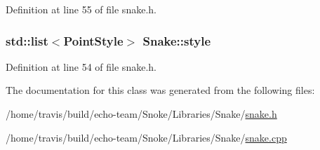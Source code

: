 Definition at line 55 of file snake.\-h.

\hypertarget{class_snake_a7db439ed2dd1cfea4c061e6ffd6ec54c}{
\subsubsection[{style}]{\setlength{\rightskip}{0pt plus 5cm}std\-::list$<${\bf Point\-Style}$>$ Snake\-::style\hspace{0.3cm}{\ttfamily [private]}}}\label{class_snake_a7db439ed2dd1cfea4c061e6ffd6ec54c}


Definition at line 54 of file snake.\-h.



The documentation for this class was generated from the following files\-:\begin{DoxyCompactItemize}
\item 
/home/travis/build/echo-\/team/\-Snoke/\-Libraries/\-Snake/\hyperlink{snake_8h}{snake.\-h}\item 
/home/travis/build/echo-\/team/\-Snoke/\-Libraries/\-Snake/\hyperlink{snake_8cpp}{snake.\-cpp}\end{DoxyCompactItemize}
